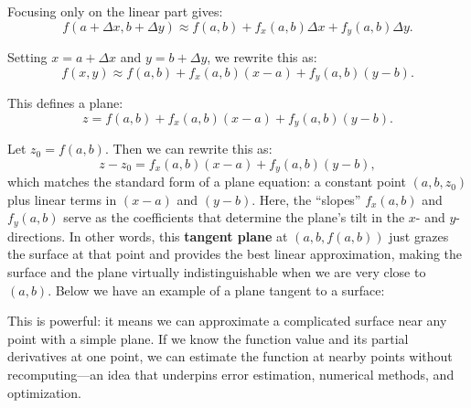 \noindent Focusing only on the linear part gives:
\[
f(a+\Delta x, b+\Delta y) \approx f(a,b) + f_x(a,b)\Delta x + f_y(a,b)\Delta y.
\]

\noindent Setting \( x = a + \Delta x \) and \( y = b + \Delta y \), we rewrite this as:
\[
f(x,y) \approx f(a,b) + f_x(a,b)(x - a) + f_y(a,b)(y - b).
\]

\noindent This defines a plane:
\[
z = f(a,b) + f_x(a,b)(x - a) + f_y(a,b)(y - b).
\]

Let \( z_0 = f(a,b) \). Then we can rewrite this as:
\[
z - z_0 = f_x(a,b)(x - a) + f_y(a,b)(y - b),
\]
which matches the standard form of a plane equation: a constant point \((a,b,z_0)\) plus linear terms in \((x-a)\) and \((y-b)\). Here, the ``slopes'' \( f_x(a,b) \) and \( f_y(a,b) \) serve as the coefficients that determine the plane’s tilt in the \( x \)- and \( y \)-directions. In other words, this \textbf{tangent plane} at \((a,b,f(a,b))\) just grazes the surface at that point and provides the best linear approximation, making the surface and the plane virtually indistinguishable when we are very close to \((a,b)\). Below we have an example of a plane tangent to a surface:

\noindent This is powerful: it means we can approximate a complicated surface near any point with a simple plane. If we know the function value and its partial derivatives at one point, we can estimate the function at nearby points without recomputing---an idea that underpins error estimation, numerical methods, and optimization.\\ \\


